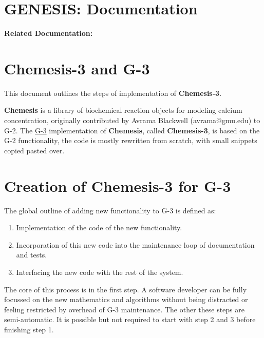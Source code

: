 \documentclass[12pt]{article}
\begin{document}
\section*{GENESIS: Documentation}

{\bf Related Documentation:}

\section*{Chemesis-3 and G-3}

This document outlines the steps of implementation of {\bf
  Chemesis-3}.

{\bf Chemesis} is a library of biochemical reaction objects for
modeling calcium
concentration\cite{blackwell02:_neuros_datab_pract_guide}, originally
contributed by Avrama Blackwell (avrama@gmu.edu) to G-2.  The
\href{../genesis-overview/genesis-overview.tex}{G-3} implementation of
{\bf Chemesis}, called {\bf Chemesis-3}, is based on the G-2
functionality, the code is mostly rewritten from scratch, with small
snippets copied pasted over.

\section*{Creation of {\bf Chemesis-3} for G-3}

The global outline of adding new functionality to G-3 is defined as:
\begin{enumerate}
\item Implementation of the code of the new functionality.
\item Incorporation of this new code into the maintenance loop of
  documentation and tests.
\item Interfacing the new code with the rest of the system.
\end{enumerate}

The core of this process is in the first step.  A software developer
can be fully focussed on the new mathematics and algorithms without
being distracted or feeling restricted by overhead of G-3 maintenance.
The other these steps are semi-automatic.  It is possible but not
required to start with step 2 and 3 before finishing step 1.
\end{document}
